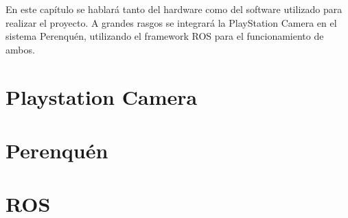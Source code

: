 
En este capítulo se hablará tanto del hardware como del software utilizado para
realizar el proyecto. A grandes rasgos se integrará la PlayStation Camera en el
sistema Perenquén, utilizando el framework ROS para el funcionamiento de ambos.


\section{Playstation Camera}
\label{3:sec1}


\section{Perenquén}
\label{3:sec2}



\section{ROS}
\label{3:sec3}

